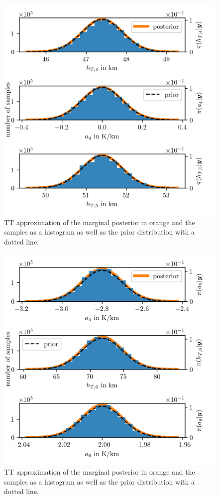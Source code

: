 \begin{figure}[ht!]
	\centering
	\includegraphics{PHdPTPost4.png}
	\caption[Histograms and TT approximation of posterior distribution as well as hyper-prior distribution.]{TT approximation of the marginal posterior in orange and the samples as a histogram as well as the prior distribution with a dotted line.}
	\label{fig:PostHistTT4}
\end{figure}
\begin{figure}[ht!]
	\centering
	\includegraphics{PHdPTPost5.png}
	\caption[Histograms and TT approximation of posterior distribution as well as hyper-prior distribution.]{TT approximation of the marginal posterior in orange and the samples as a histogram as well as the prior distribution with a dotted line.}
	\label{fig:PostHistTT5}
\end{figure}

